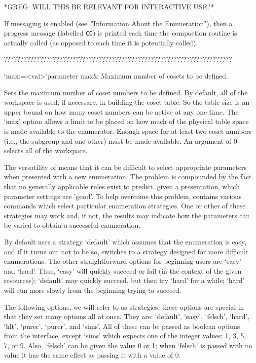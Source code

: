 *GREG:
WILL THIS BE RELEVANT FOR INTERACTIVE USE?*

If  messaging is  enabled (see~"Information  About  the Enumeration"),
then a progress  message (labelled {\tt CO}) is  printed each time the
compaction routine is  actually called (as opposed to  each time it is
potentially called).

??????????????????????????????????????????????????????????????????????


\>`max:=<val>'{parameter max}&
Maximum number of cosets to be defined.

Sets the maximum  number of coset numbers to  be defined.  By default,
all  of the workspace  is used,  if necessary,  in building  the coset
table.  So the table size is  an upper bound on how many coset numbers
can be active at any one time.   The `max' option allows a limit to be
placed on  how much of the  physical table space is  made available to
the enumerator.   Enough space for  at least two coset  numbers (i.e.,
the subgroup and one other) must  be made available.  An argument of 0
selects all of the workspace.

\enditems



    The versatility  of {\ACE}  means that it  can be difficult  to select
    appropriate  parameters when  presented with  a new  enumeration.  The
    problem is compounded  by the fact that no  generally applicable rules
    exist to  predict, given a presentation, which  parameter settings are
    'good'.   To  help  overcome  this problem,  {\ACE}  contains  various
    commands which select particular enumeration strategies.  One or other
    of these strategies may work and, if not, the results may indicate how
    the parameters can be varied  to obtain a successful enumeration.  

    By default  {\ACE} uses  a strategy `default'  which assumes  that the
    enumeration is easy, and if it turns out not to be so, {\ACE} switches
    to  a strategy designed  for more  difficult enumerations.   The other
    straightforward  options for  beginning users  are `easy'  and `hard'.
    Thus, `easy' will quickly succeed or fail (in the context of the given
    resources); `default' may  quickly succeed, but then try  `hard' for a
    while;  `hard' will  run  more  slowly from  the  beginning trying  to
    succeed.

    The following options, we will refer to as strategies; these options
    are special in that they set many options all at once. They are:
    `default',  `easy',   `felsch', `hard', `hlt', `purec', `purer', and
    `sims'. All of these can be passed as boolean options from the {\ACE}
    interface, except `sims' which expects one of the integer values: 1,
    3, 5, 7, or 9. Also, `felsch' can be given the value 0 or 1; when
    `felsch' is passed with no value it has the same effect as passing it
    with a value of 0.

